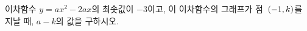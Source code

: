 \hspace*{2mm}\begin{minipage}[t]{\dimexpr\linewidth-2mm\relax}\vspace{0pt}
이차함수 $y=ax^2-2ax$의 최솟값이 $-3$이고, 이 이차함수의 그래프가 점~$(-1{,}\mkern3mu k)$를 지날 때, $a-k$의 값을 구하시오. \end{minipage}
